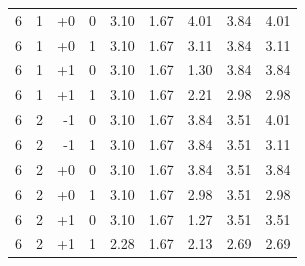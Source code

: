 \begin{tabular}{@{}rrrrrrrrr@{}}
6 & 1 & +0 & 0 & 3.10 & 1.67 & 4.01 & 3.84 & 4.01 \\
6 & 1 & +0 & 1 & 3.10 & 1.67 & 3.11 & 3.84 & 3.11 \\
6 & 1 & +1 & 0 & 3.10 & 1.67 & 1.30 & 3.84 & 3.84 \\
6 & 1 & +1 & 1 & 3.10 & 1.67 & 2.21 & 2.98 & 2.98 \\
6 & 2 & -1 & 0 & 3.10 & 1.67 & 3.84 & 3.51 & 4.01 \\
6 & 2 & -1 & 1 & 3.10 & 1.67 & 3.84 & 3.51 & 3.11 \\
6 & 2 & +0 & 0 & 3.10 & 1.67 & 3.84 & 3.51 & 3.84 \\
6 & 2 & +0 & 1 & 3.10 & 1.67 & 2.98 & 3.51 & 2.98 \\
6 & 2 & +1 & 0 & 3.10 & 1.67 & 1.27 & 3.51 & 3.51 \\
6 & 2 & +1 & 1 & 2.28 & 1.67 & 2.13 & 2.69 & 2.69 \\
\bottomrule
\end{tabular}